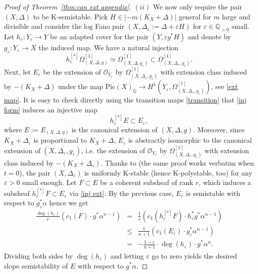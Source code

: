 \documentclass[12pt]{amsart}
\theoremstyle{definition}
\newcommand{\cO}{\mathcal{O}}
\numberwithin{equation}{section}
\newcommand{\Q}{\mathbb Q}
\newcommand{\ep}{\varepsilon}
\begin{document}
\begin{proof}[Proof of Theorem~\ref{thm:can ext appendix}]
$(ii)$ We now only require the pair $(X,\Delta)$ to be K-semistable. Pick $H\in |-m(K_X+\Delta)|$ general for $m$ large and divisible and consider the log Fano pair $(X,\Delta_\ep:=\Delta+\ep H)$ for $\ep\in \Q_{>0}$ small. Let $h_\ep:Y_\ep\to Y$ be an adapted cover for the pair $(Y,\ep g^* H)$ and denote by $g_\ep : Y_\ep \to X$ the induced map. We have a natural injection 
\begin{equation}
\label{inj form}
h_\ep^{[*]}\Omega_{(X,\Delta, g)}^{[1]}\simeq \Omega_{(X,\Delta,g_\ep)}^{[1]}\subset \Omega_{(X,\Delta_\ep,g_\ep)}^{[1]}.
\end{equation} Next, let $E_\ep$ be the extension of $\cO_{Y_\ep}$ by $\Omega_{(X,\Delta_\ep, g_\ep)}^{[1]}$ with extension class induced by $-(K_X+\Delta)$ under the map $\mathrm{Pic}(X)_{\Q}\to H^1(Y_\ep, \Omega_{(X,\Delta_\ep, g_\ep)}^{[1]})$, see \eqref{ext map}.  It is easy to check directly using the transition maps \eqref{transition} that \eqref{inj form} induces an injective map 
\begin{equation}
\label{inj ext}
h_\ep^{[*]}E\subset E_\ep,
\end{equation}
where $E:=E_{(X,\Delta,g)}$ is the canonical extension of $(X,\Delta, g)$. Moreover, since $K_X+\Delta_\ep$ is proportional to $K_X+\Delta$, $E_\ep$ is abstractly isomorphic to the canonical extension of $(X,\Delta_\ep, g_\ep)$, i.e. the extension of $\cO_{Y_\ep}$ by $\Omega_{(X,\Delta_\ep, g_\ep)}^{[1]}$ with extension class induced by $-(K_X+\Delta_\ep)$. Thanks to \cite[Lemma 5.5]{LXZ-HRFG} (the same proof works verbatim when $t=0$), the pair $(X,\Delta_\ep)$ is uniformly K-stable (hence K-polystable, too) for any $\ep>0$ small enough. Let $F\subset E$ be a coherent subsheaf of rank $r$, which induces a subsheaf $h_\ep^{[*]}F\subset E_\ep$ via \eqref{inj ext}.  By the previous case, $E_\ep$ is semistable with respect to $g_\ep^*\alpha$ hence we get
\begin{eqnarray*}
\frac{\deg(h_\ep)}{r}(c_1(F) \cdot g^*\alpha^{n-1})&=& \frac 1 r (c_1(h_\ep^{[*]}F) \cdot h_\ep^*g^*\alpha^{n-1})\\
& \le& \frac{1}{n+1}(c_1(E_\ep) \cdot g_\ep^*\alpha^{n-1})\\
&=&-\frac{1-\ep}{n+1}  \cdot \deg(h_\ep) \cdot g^*\alpha^n.  
\end{eqnarray*}
Dividing both sides by $\deg(h_\ep)$ and letting $\ep$ go to zero yields the desired slope semistability of $E$ with respect to $g^*\alpha$.
\end{proof}

\clearpage
\markboth{}{}



\end{document}
